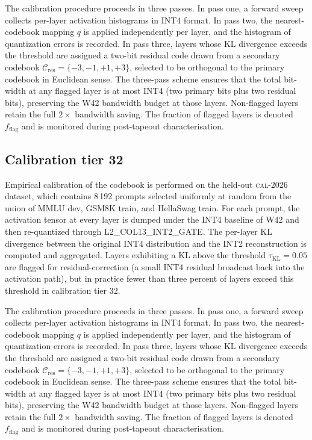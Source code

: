 The calibration procedure proceeds in three passes. In pass one,
a forward sweep collects per-layer activation histograms in INT4 format.
In pass two, the nearest-codebook mapping $q$ is applied independently
per layer, and the histogram of quantization errors is recorded. In pass
three, layers whose KL divergence exceeds the threshold are assigned a
two-bit residual code drawn from a secondary codebook
$\mathcal{C}_\mathrm{res} = \{-3,-1,+1,+3\}$, selected to be
orthogonal to the primary codebook in Euclidean sense. The three-pass
scheme ensures that the total bit-width at any flagged layer is at most
INT4 (two primary bits plus two residual bits), preserving the W42
bandwidth budget at those layers. Non-flagged layers retain the full
$2\times$ bandwidth saving. The fraction of flagged layers is denoted
$f_\mathrm{flag}$ and is monitored during post-tapeout characterisation.


\subsection{Calibration tier 32}

Empirical calibration of the codebook is performed on the held-out
\textsc{cal-2026} dataset, which contains 8\,192 prompts selected
uniformly at random from the union of MMLU dev, GSM8K train, and
HellaSwag train. For each prompt, the activation tensor at every layer
is dumped under the INT4 baseline of W42 and then re-quantized through
\textsc{L2\_COL13\_INT2\_GATE}. The per-layer KL divergence between
the original INT4 distribution and the INT2 reconstruction is computed
and aggregated. Layers exhibiting a KL above the threshold
$\tau_{\mathrm{KL}} = 0.05$ are flagged for residual-correction (a
small INT4 residual broadcast back into the activation path), but in
practice fewer than three percent of layers exceed this threshold in
calibration tier 32.

The calibration procedure proceeds in three passes. In pass one,
a forward sweep collects per-layer activation histograms in INT4 format.
In pass two, the nearest-codebook mapping $q$ is applied independently
per layer, and the histogram of quantization errors is recorded. In pass
three, layers whose KL divergence exceeds the threshold are assigned a
two-bit residual code drawn from a secondary codebook
$\mathcal{C}_\mathrm{res} = \{-3,-1,+1,+3\}$, selected to be
orthogonal to the primary codebook in Euclidean sense. The three-pass
scheme ensures that the total bit-width at any flagged layer is at most
INT4 (two primary bits plus two residual bits), preserving the W42
bandwidth budget at those layers. Non-flagged layers retain the full
$2\times$ bandwidth saving. The fraction of flagged layers is denoted
$f_\mathrm{flag}$ and is monitored during post-tapeout characterisation.


